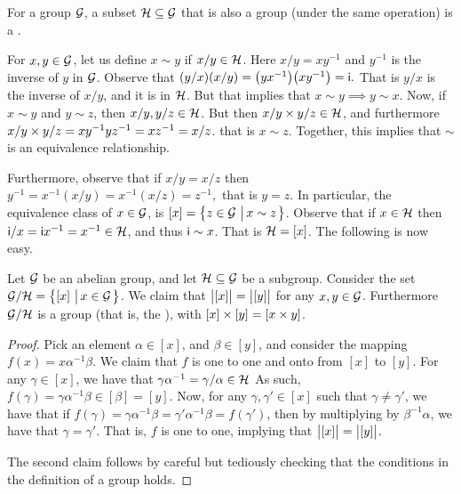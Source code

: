 For a group $\mathcal{G}$, a subset $\mathcal{H} \subseteq \mathcal{G}$ that is also
a group (under the same operation) is a .

For $x, y \in \mathcal{G}$, let us define $x \sim y$ if $x/y \in
\mathcal{H}$. Here $x/y = x y^{-1}$ and $y^{-1}$ is the inverse of $y$ in
$\mathcal{G}$. Observe that 
\begin{math}
    \pth{y/x}\pth[]{x/y} = \pth[]{yx^{-1}} \pth[]{xy^{-1}} = \gIdent.
\end{math}
That is $y/x$ is the inverse of $x/y$, and it is in $\mathcal{H}$. But
that implies that $x \sim y \implies y \sim x$. Now, if $x \sim y$ and
$y \sim z$, then $x/y, y/z \in \mathcal{H}$. But then $x/y \times y/z \in
\mathcal{H}$, and furthermore $x/y \times y/z = x y^{-1} y z^{-1} = x z^{-1}
= x/z$. that is $x \sim z$. Together, this implies that $\sim$ is an
equivalence relationship.

Furthermore, observe that if $x/y = x/z$ then 
\begin{math}
    y^{-1} = x^{-1} (x/y) = 
    x^{-1} (x/z) = z^{-1},
\end{math}
that is $y=z$. In particular, the equivalence class of $x \in \mathcal{G}$,
is $[x] = \left\{ {z \in \mathcal{G} \,\left|\, {x \sim z} \bigr.\right.} \right\}$. Observe that if $x \in
\mathcal{H}$ then $\mathsf{i} / x = \mathsf{i} x^{-1} = x^{-1} \in \mathcal{H}$, and
thus $\mathsf{i} \sim x$. That is $\mathcal{H} = [x]$. The following is now
easy.

\begin{lemma}
    Let $\mathcal{G}$ be an abelian group, and let $\mathcal{H} \subseteq
    \mathcal{G}$ be a subgroup.  Consider the set $\mathcal{G} / \mathcal{H} = \left\{ {
       [x] \,\left|\, { x \in \mathcal{G}} \bigr.\right.} \right\}$. We claim that $\left| {\bigl. [x]} \right| =
    \left| {\bigl. [y]} \right|$ for any $x,y \in \mathcal{G}$.  Furthermore
    $\mathcal{G}/ \mathcal{H}$ is a group (that is, the ), with $[x] \times [y] = [x \times y]$.
\end{lemma}
\begin{proof}
    Pick an element $\alpha \in [x]$, and $\beta \in [y]$, and
    consider the mapping $f(x) = x \alpha^{-1} \beta$. We claim that
    $f$ is one to one and onto from $[x]$ to $[y]$.  For any $\gamma
    \in [x]$, we have that $\gamma\alpha^{-1} =\gamma/\alpha \in
    \mathcal{H}$ As such, $f(\gamma ) = \gamma \alpha^{-1} \beta \in
    [\beta] = [y]$. Now, for any $\gamma, \gamma' \in [x]$ such that
    $\gamma \neq \gamma'$, we have that if $f(\gamma)
    =\gamma\alpha^{-1} \beta = \gamma'\alpha^{-1} \beta = f(\gamma')$,
    then by multiplying by $\beta^{-1} \alpha$, we have that $\gamma =
    \gamma'$. That is, $f$ is one to one, implying that
    $\left| {\bigl. [x]} \right| = \left| {\bigl. [y]} \right|$.

    The second claim follows by careful but tediously checking that
    the conditions in the definition of a group holds.
\end{proof}

